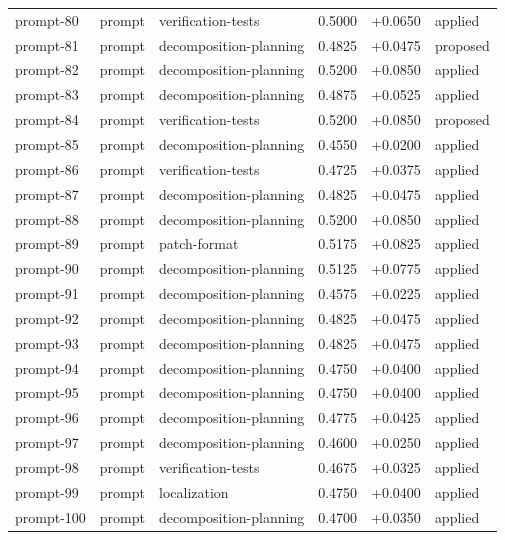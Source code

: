 \begin{center}
\begin{longtable}{llp{5.2cm}rrl}
prompt-80 & prompt & verification-tests & 0.5000 & +0.0650 & applied \\
prompt-81 & prompt & decomposition-planning & 0.4825 & +0.0475 & proposed \\
prompt-82 & prompt & decomposition-planning & 0.5200 & +0.0850 & applied \\
prompt-83 & prompt & decomposition-planning & 0.4875 & +0.0525 & applied \\
prompt-84 & prompt & verification-tests & 0.5200 & +0.0850 & proposed \\
prompt-85 & prompt & decomposition-planning & 0.4550 & +0.0200 & applied \\
prompt-86 & prompt & verification-tests & 0.4725 & +0.0375 & applied \\
prompt-87 & prompt & decomposition-planning & 0.4825 & +0.0475 & applied \\
prompt-88 & prompt & decomposition-planning & 0.5200 & +0.0850 & applied \\
prompt-89 & prompt & patch-format & 0.5175 & +0.0825 & applied \\
prompt-90 & prompt & decomposition-planning & 0.5125 & +0.0775 & applied \\
prompt-91 & prompt & decomposition-planning & 0.4575 & +0.0225 & applied \\
prompt-92 & prompt & decomposition-planning & 0.4825 & +0.0475 & applied \\
prompt-93 & prompt & decomposition-planning & 0.4825 & +0.0475 & applied \\
prompt-94 & prompt & decomposition-planning & 0.4750 & +0.0400 & applied \\
prompt-95 & prompt & decomposition-planning & 0.4750 & +0.0400 & applied \\
prompt-96 & prompt & decomposition-planning & 0.4775 & +0.0425 & applied \\
prompt-97 & prompt & decomposition-planning & 0.4600 & +0.0250 & applied \\
prompt-98 & prompt & verification-tests & 0.4675 & +0.0325 & applied \\
prompt-99 & prompt & localization & 0.4750 & +0.0400 & applied \\
prompt-100 & prompt & decomposition-planning & 0.4700 & +0.0350 & applied \\
\bottomrule\end{longtable}\end{center}
\clearpage
